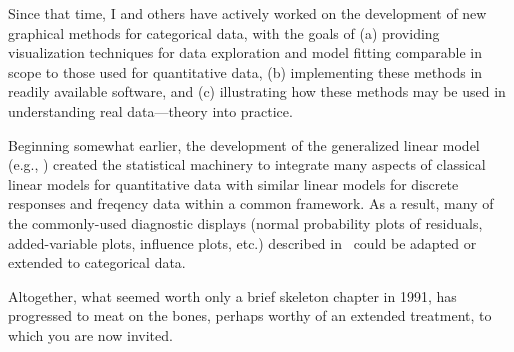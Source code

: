 Since that time, I and others have actively worked on the
development of new graphical methods for categorical data,
with the goals of (a) providing visualization techniques for data
exploration and model fitting comparable in scope to those used
for quantitative data, (b) implementing these methods in
readily available software, and (c) illustrating how these methods
may be used in understanding real data---theory into practice.

Beginning somewhat earlier, the development of the generalized
linear model (e.g., \citet{McCullaghNelder:89}) created the
statistical machinery to integrate many aspects of classical linear
models for quantitative data with similar linear models for discrete
responses and freqency data within a common framework.  As a result,
many of the commonly-used diagnostic displays (normal probability
plots of residuals, added-variable plots, influence plots, etc.)
described in \SSSG\ could be adapted or extended to categorical
data.

Altogether, what seemed worth only a brief skeleton chapter in
1991, has progressed to meat on the bones,
perhaps worthy of an extended treatment, to which you are now
invited.

